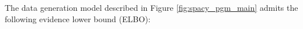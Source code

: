 \begin{proposition}
    The data generation model described in Figure \ref{fig:spacy_pgm_main} admits the following evidence lower bound (ELBO):
    


\end{proposition}
